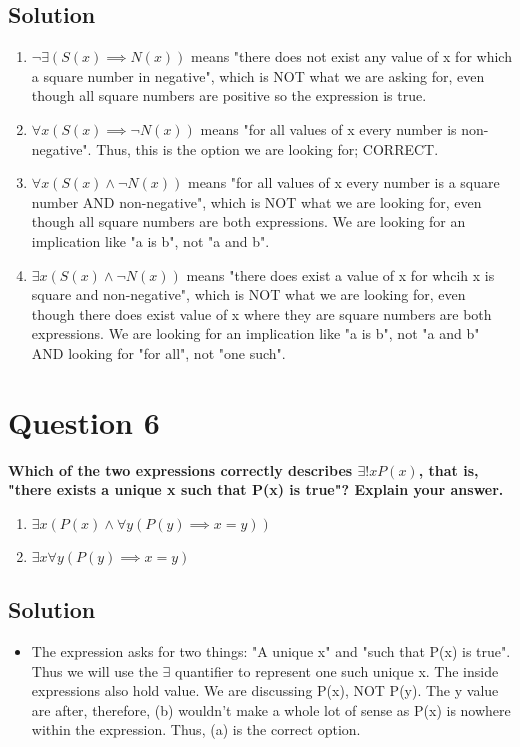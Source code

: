 \documentclass[11pt]{article}
\begin{document}
    \subsection*{Solution}
    \begin{enumerate}[label=(\alph*)]
        \item \(\neg \exists (S(x) \implies N(x))\) means "there does not exist any value of x for which a square number in negative", which is NOT what we are asking for, even though all square numbers are positive so the expression is true.
        \item \(\forall x(S(x) \implies \neg N(x))\) means "for all values of x every number is non-negative". Thus, this is the option we are looking for; CORRECT.
        \item \(\forall x(S(x) \land \neg N(x))\) means "for all values of x every number is a square number AND non-negative", which is NOT what we are looking for, even though all square numbers are both expressions. We are looking for an implication like "a is b", not "a and b".
        \item \(\exists x (S(x) \land \neg N(x))\) means "there does exist a value of x for whcih x is square and non-negative", which is NOT what we are looking for, even though there does exist value of x where they are square numbers are both expressions. We are looking for an implication like "a is b", not "a and b" AND looking for "for all", not "one such".
    \end{enumerate}
    
\clearpage
\section*{Question 6}
    \textbf{Which of the two expressions correctly describes \(\exists !xP(x)\), that is, "there exists a unique x such that P(x) is true"? Explain your answer.}
    \begin{enumerate}[label=(\alph*)]
        \item \(\exists x (P(x) \land \forall y (P(y) \implies x = y))\)
        \item \(\exists x \forall y (P(y) \implies x =y)\)
    \end{enumerate}
    \subsection*{Solution}
    \begin{itemize}
        \item[] The expression asks for two things: "A unique x" and "such that P(x) is true". Thus we will use the \(\exists\) quantifier to represent one such unique x. The inside expressions also hold value. We are discussing P(x), NOT P(y). The y value are after, therefore, (b) wouldn't make a whole lot of sense as P(x) is nowhere within the expression. Thus, (a) is the correct option.
    \end{itemize}
    
\end{document}
